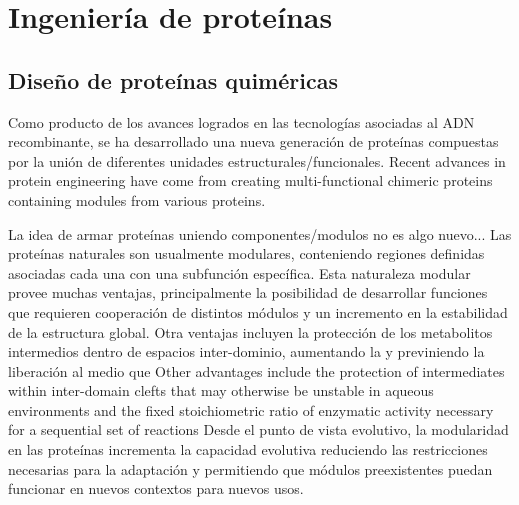 \section{Ingeniería de proteínas}
\label{proteinEngineering}




\subsection{Diseño de proteínas quiméricas}


Como producto de los avances logrados en las tecnologías asociadas al ADN recombinante, se ha desarrollado una nueva generación de proteínas compuestas por la unión de diferentes unidades estructurales/funcionales.
Recent advances in protein engineering have come from creating multi-functional chimeric proteins containing modules from various proteins.





La idea de armar proteínas uniendo componentes/modulos no es algo nuevo...
Las proteínas naturales son usualmente modulares, conteniendo regiones definidas asociadas cada una con una subfunción específica.
Esta naturaleza modular provee muchas ventajas, principalmente la posibilidad de desarrollar funciones que requieren cooperación de distintos módulos y un incremento en la estabilidad de la estructura global.
Otra ventajas incluyen la protección de los metabolitos intermedios dentro de espacios inter-dominio, aumentando la   y previniendo la liberación al medio que 
Other advantages include the protection of intermediates within inter-domain clefts that may otherwise be unstable in aqueous environments 
and the fixed stoichiometric ratio of enzymatic activity necessary for a sequential set of reactions
Desde el punto de vista evolutivo, la modularidad en las proteínas incrementa la capacidad evolutiva reduciendo las restricciones necesarias para la adaptación y permitiendo que módulos preexistentes puedan funcionar en nuevos contextos para nuevos usos.



